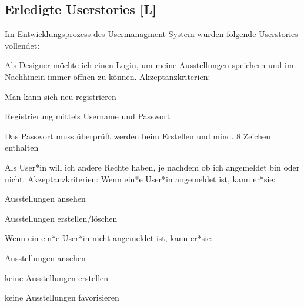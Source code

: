\subsection{Erledigte Userstories [L]}
Im Entwicklungsprozess des Usermanagment-System wurden folgende Userstories vollendet: 
\begin{compactenum}
  \item Als Designer möchte ich einen Login, um meine Ausstellungen speichern und im Nachhinein immer öffnen zu können.
  Akzeptanzkriterien:
  \begin{compactitem}
      \item Man kann sich neu registrieren
      \item Registrierung mittels Username und Passwort
      \item Das Passwort muss überprüft werden beim Erstellen und mind. 8 Zeichen enthalten
  \end{compactitem}
  \item Als User*in will ich andere Rechte haben, je nachdem ob ich angemeldet bin oder nicht. Akzeptanzkriterien:
  Wenn ein*e User*in angemeldet ist, kann er*sie:
      \begin{compactitem}
          \item Ausstellungen ansehen
          \item Ausstellungen erstellen/löschen
      \end{compactitem}  
  Wenn ein ein*e User*in nicht angemeldet ist, kann er*sie:
      \begin{compactitem}
          \item Ausstellungen ansehen
          \item keine Ausstellungen erstellen
          \item keine Ausstellungen favorisieren
      \end{compactitem} 
\end{compactenum}